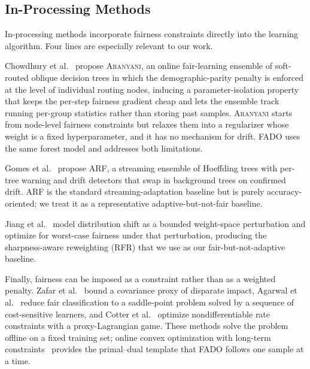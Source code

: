 \documentclass[conference]{IEEEtran}
\newcommand{\fado}{\textsc{FADO}}
\newcommand{\ara}{\textsc{Aranyani}}
\newcommand{\arf}{\textsc{ARF}}
\newcommand{\rfr}{\textsc{RFR}}
\begin{document}
\subsection{In-Processing Methods}
In-processing methods incorporate fairness constraints directly into the learning algorithm. Four lines are especially relevant to our work.

Chowdhury et al.~\cite{chowdhury2024enhancing} propose \ara{}, an online fair-learning ensemble of soft-routed oblique decision trees in which the
demographic-parity penalty is enforced at the level of individual routing nodes, inducing a parameter-isolation property that keeps the per-step fairness gradient
cheap and lets the ensemble track running per-group statistics rather than storing past samples. \ara{} starts from node-level fairness constraints but relaxes
them into a regularizer whose weight is a fixed hyperparameter, and it has no mechanism for drift. \fado{} uses the same forest model and addresses
both limitations.

Gomes et al.~\cite{10.1007/s10994-017-5642-8} propose \arf{}, a streaming ensemble of Hoeffding trees with per-tree warning and drift detectors that swap in
background trees on confirmed drift. \arf{} is the standard streaming-adaptation baseline but is purely accuracy-oriented; we treat it as a representative
adaptive-but-not-fair baseline.

Jiang et al.~\cite{jiang2023chasingfairnessdistributionshift} model distribution shift as a bounded weight-space perturbation and optimize for worst-case
fairness under that perturbation, producing the sharpness-aware reweighting (\rfr{}) that we use as our fair-but-not-adaptive baseline.

Finally, fairness can be imposed as a constraint rather than as a weighted penalty. Zafar et al.~\cite{zafar2017fairnessconstraintsmechanismsfair} bound a covariance proxy of disparate
impact, Agarwal et al.~\cite{agarwal2018reductionsapproachfairclassification} reduce fair classification to a saddle-point problem solved by a sequence of cost-sensitive learners, and Cotter
et al.~\cite{cotter2018optimizationnondifferentiableconstraintsapplications} optimize nondifferentiable rate constraints with a proxy-Lagrangian game. These methods solve the problem offline on a fixed
training set; online convex optimization with long-term constraints~\cite{mahdavi2012trading} provides the primal--dual template that \fado{} follows one sample at a
time.
\end{document}
